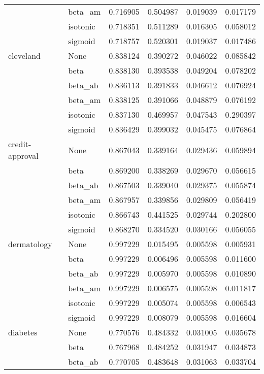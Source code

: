 \begin{tabular}{llrrrr}
        & beta\_am &  0.716905 &  0.504987 &  0.019039 &  0.017179 \\
        & isotonic &  0.718351 &  0.511289 &  0.016305 &  0.058012 \\
        & sigmoid &  0.718757 &  0.520301 &  0.019037 &  0.017486 \\
cleveland & None &  0.838124 &  0.390272 &  0.046022 &  0.085842 \\
        & beta &  0.838130 &  0.393538 &  0.049204 &  0.078202 \\
        & beta\_ab &  0.836113 &  0.391833 &  0.046612 &  0.076924 \\
        & beta\_am &  0.838125 &  0.391066 &  0.048879 &  0.076192 \\
        & isotonic &  0.837130 &  0.469957 &  0.047543 &  0.290397 \\
        & sigmoid &  0.836429 &  0.399032 &  0.045475 &  0.076864 \\
credit-approval & None &  0.867043 &  0.339164 &  0.029436 &  0.059894 \\
        & beta &  0.869200 &  0.338269 &  0.029670 &  0.056615 \\
        & beta\_ab &  0.867503 &  0.339040 &  0.029375 &  0.055874 \\
        & beta\_am &  0.867957 &  0.339856 &  0.029809 &  0.056419 \\
        & isotonic &  0.866743 &  0.441525 &  0.029744 &  0.202800 \\
        & sigmoid &  0.868270 &  0.334520 &  0.030166 &  0.056055 \\
dermatology & None &  0.997229 &  0.015495 &  0.005598 &  0.005931 \\
        & beta &  0.997229 &  0.006496 &  0.005598 &  0.011600 \\
        & beta\_ab &  0.997229 &  0.005970 &  0.005598 &  0.010890 \\
        & beta\_am &  0.997229 &  0.006575 &  0.005598 &  0.011817 \\
        & isotonic &  0.997229 &  0.005074 &  0.005598 &  0.006543 \\
        & sigmoid &  0.997229 &  0.008079 &  0.005598 &  0.016604 \\
diabetes & None &  0.770576 &  0.484332 &  0.031005 &  0.035678 \\
        & beta &  0.767968 &  0.484252 &  0.031947 &  0.034873 \\
        & beta\_ab &  0.770705 &  0.483648 &  0.031063 &  0.033704 \\

\end{tabular}
